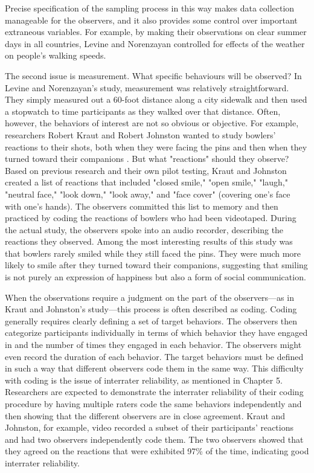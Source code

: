 Precise specification of the sampling process in this way makes data collection manageable for the observers, and it also provides some control over important extraneous variables. For example, by making their observations on clear summer days in all countries, Levine and Norenzayan controlled for effects of the weather on people's walking speeds.


The second issue is measurement. What specific behaviours will be observed? In Levine and Norenzayan's study, measurement was relatively straightforward. They simply measured out a 60-foot distance along a city sidewalk and then used a stopwatch to time participants as they walked over that distance. Often, however, the behaviors of interest are not so obvious or objective. For example, researchers Robert Kraut and Robert Johnston wanted to study bowlers' reactions to their shots, both when they were facing the pins and then when they turned toward their companions \citep{kraut_social_1979}. But what "reactions" should they observe? Based on previous research and their own pilot testing, Kraut and Johnston created a list of reactions that included "closed smile," "open smile," "laugh," "neutral face," "look down," "look away," and "face cover" (covering one's face with one's hands). The observers committed this list to memory and then practiced by coding the reactions of bowlers who had been videotaped. During the actual study, the observers spoke into an audio recorder, describing the reactions they observed. Among the most interesting results of this study was that bowlers rarely smiled while they still faced the pins. They were much more likely to smile after they turned toward their companions, suggesting that smiling is not purely an expression of happiness but also a form of social communication.


When the observations require a judgment on the part of the observers---as in Kraut and Johnston's study---this process is often described as coding. Coding generally requires clearly defining a set of target behaviors. The observers then categorize participants individually in terms of which behavior they have engaged in and the number of times they engaged in each behavior. The observers might even record the duration of each behavior. The target behaviors must be defined in such a way that different observers code them in the same way. This difficulty with coding is the issue of interrater reliability, as mentioned in Chapter 5. Researchers are expected to demonstrate the interrater reliability of their coding procedure by having multiple raters code the same behaviors independently and then showing that the different observers are in close agreement. Kraut and Johnston, for example, video recorded a subset of their participants' reactions and had two observers independently code them. The two observers showed that they agreed on the reactions that were exhibited 97\% of the time, indicating good interrater reliability.


